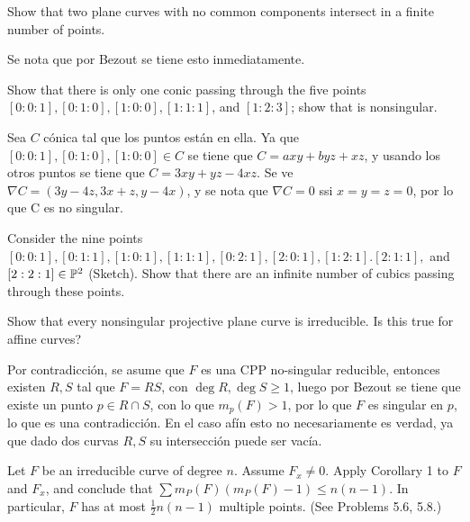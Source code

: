 \begin{prob}{5.7}
    Show that two plane curves with no common components intersect in a finite number of points.
\end{prob}

\begin{sol}{5.7}
    Se nota que por Bezout se tiene esto inmediatamente.
\end{sol}

\begin{prob}{5.18}
    Show that there is only one conic passing through the five points \([0:0:1],[0:1:0],[1:0:0],[1:1:1]\), and \([1:2:3]\); show that is nonsingular.
\end{prob}

\begin{sol}{5.18}
    Sea \(C\) cónica tal que los puntos están en ella. Ya que \([0:0:1],[0:1:0],[1:0:0]\in C\) se tiene que \(C=axy+byz+xz\), y usando los otros puntos se tiene que \(C=3xy+yz-4xz\). Se ve \(\nabla C=(3y-4z,3x+z,y-4x)\), y se nota que \(\nabla C=0\) ssi \(x=y=z=0\), por lo que C es no singular.
\end{sol}

\begin{prob}{5.19}
    Consider the nine points \([0:0:1],[0:1:1],[1:0:1],[1:1:1],[0:2:1],[2:0:1],[1:2:1].[2:1:1],\) and \([2:2:1]\in\mathbb{P}^2\) (Sketch). Show that there are an infinite number of cubics passing through these points.
\end{prob}

\begin{sol}{5.19}

\end{sol}

\begin{prob}{5.21}
    Show that every nonsingular projective plane curve is irreducible. Is this true for affine curves?
\end{prob}

\begin{sol}{5.21}
    Por contradicción, se asume que \(F\) es una CPP no-singular reducible, entonces existen \(R,S\) tal que \(F=RS\), con \(\deg R,\deg S\geq 1\), luego por Bezout se tiene que existe un punto \(p\in R\cap S\), con lo que \(m_p(F)>1\), por lo que \(F\) es singular en \(p\), lo que es una contradicción. En el caso afín esto no necesariamente es verdad, ya que dado dos curvas \(R,S\) su intersección puede ser vacía.
\end{sol}

\begin{prob}{5.22}
    Let \(F\) be an irreducible curve of degree \(n\). Assume \(F_x\neq0\). Apply Corollary 1 to \(F\) and \(F_x\), and conclude that \(\sum m_P(F)(m_P(F)-1)\leq n(n-1)\). In particular, \(F\) has at most \(\frac12n(n-1)\) multiple points. (See Problems 5.6, 5.8.)
\end{prob}

